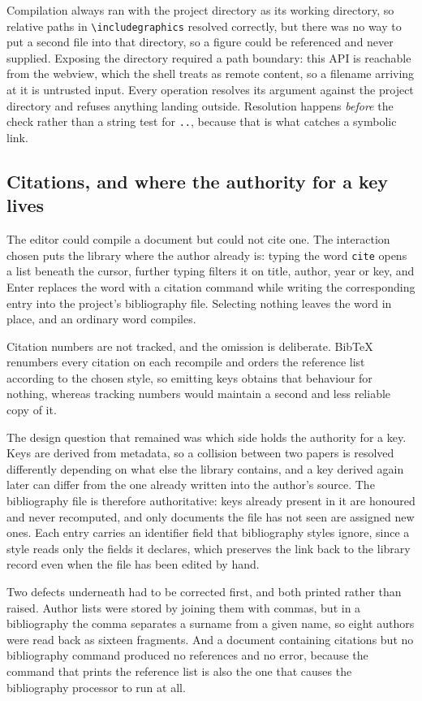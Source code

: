 \documentclass[12pt,a4paper]{report}
\begin{document}
Compilation always ran with the project directory as its working directory, so
relative paths in \verb|\includegraphics| resolved correctly, but there was
no way to put a second file into that directory, so a figure could be referenced
and never supplied. Exposing the directory required a path boundary: this API is
reachable from the webview, which the shell treats as remote content, so a
filename arriving at it is untrusted input. Every operation resolves its
argument against the project directory and refuses anything landing outside.
Resolution happens \emph{before} the check rather than a string test for
\texttt{..}, because that is what catches a symbolic link.

\subsection{Citations, and where the authority for a key lives}

The editor could compile a document but could not cite one. The interaction
chosen puts the library where the author already is: typing the word
\texttt{cite} opens a list beneath the cursor, further typing filters it on
title, author, year or key, and Enter replaces the word with a citation
command while writing the corresponding entry into the project's bibliography
file. Selecting nothing leaves the word in place, and an ordinary word
compiles.

Citation numbers are not tracked, and the omission is deliberate. BibTeX
renumbers every citation on each recompile and orders the reference list
according to the chosen style, so emitting keys obtains that behaviour for
nothing, whereas tracking numbers would maintain a second and less reliable
copy of it.

The design question that remained was which side holds the authority for a key.
Keys are derived from metadata, so a collision between two papers is resolved
differently depending on what else the library contains, and a key derived
again later can differ from the one already written into the author's source.
The bibliography file is therefore authoritative: keys already present in it are
honoured and never recomputed, and only documents the file has not seen are
assigned new ones. Each entry carries an identifier field that bibliography
styles ignore, since a style reads only the fields it declares, which preserves
the link back to the library record even when the file has been edited by hand.

Two defects underneath had to be corrected first, and both printed rather than
raised. Author lists were stored by joining them with commas, but in a
bibliography the comma separates a surname from a given name, so eight authors
were read back as sixteen fragments. And a document containing citations but no
bibliography command produced no references and no error, because the command
that prints the reference list is also the one that causes the bibliography
processor to run at all.
\end{document}
